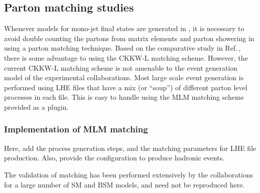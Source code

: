 \subsection{Parton matching studies}
\label{sec:monojet_parton_match}

Whenever models for mono-jet final states are generated in  \madgraph,
it is necessary to avoid double counting the partons from matrix elements and parton showering in \pythiaEight
using a parton matching technique. Based on the comparative study 
in Ref.\,\cite{Alwall:0706.2569}, there is
some advantage to using the CKKW-L matching scheme.
However, the current CKKW-L matching scheme is not amenable to the
event generation model of the experimental collaborations.
Most large scale event generation is performed using LHE files that
have a mix (or ``soup'') of different parton level processes in each file.
This is easy to handle using the MLM matching scheme provided as
a \pythiaEight plugin.

\subsubsection{Implementation of MLM matching}
\label{sec:match_implementation}


Here, add the process generation steps, and the matching parameters for
LHE file production.  Also, provide the \pythiaEight configuration to
produce hadronic events.

The validation of matching has been performed extensively by the collaborations for a large number of SM and BSM models, and need not be reproduced here.






